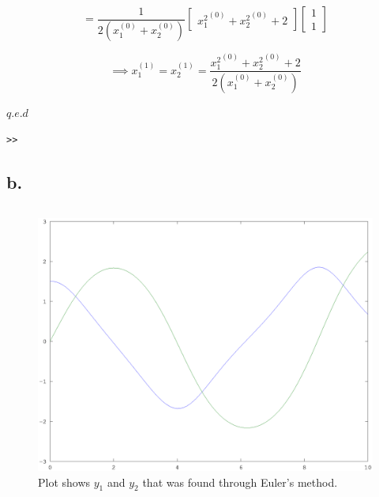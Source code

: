 \documentclass[00-main.tex]{subfiles}
\begin{document}
\begin{equation}
=
\frac{1}{2(x_1^{(0)} + x_2^{(0)})} 
\left[
\begin{array}{cc} 
	{x_1^{2}}^{(0)} + {x_2^2}^{(0)} + 2 
\end{array}
\right]
\left[
\begin{array}{cc} 	
	1 \\
	1
\end{array}
\right]
\end{equation}

\begin{equation}
\implies
x_1^{(1)} = x_2^{(1)}
=
\frac{{x_1^{2}}^{(0)} + {x_2^2}^{(0)} + 2 }{2(x_1^{(0)} + x_2^{(0)})} 
\end{equation}

$q.e.d$




\begin{verbatim}
>> 
\end{verbatim}

\subsection*{b.}



\inputminted[linenos]{matlab}{newton_c.m}

\begin{figure}
\includegraphics[width=\textwidth]{euler_plot}
\caption{Plot shows $y_1$ and $y_2$ that was found through Euler's method.}
\end{figure}


\end{document}
